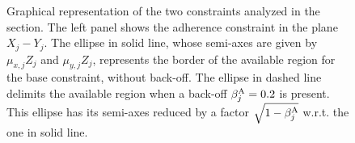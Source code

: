 \begin{figure}
	\caption{Graphical representation of the two constraints analyzed in the section. The left panel shows the adherence constraint in the plane $X_j-Y_j$. The ellipse in solid line, whose semi-axes are given by $\mu_{x,j}Z_j$ and $\mu_{y,j}Z_j$, represents the border of the available region for the base constraint, without back-off. The ellipse in dashed line delimits the available region when a back-off $\beta^\textrm{A}_j=0.2$ is present. This ellipse has its semi-axes reduced by a factor $\sqrt{1-\beta^\textrm{A}_j}$ w.r.t. the one in solid line. 
	}
	\label{fig:robust_constraints}
\end{figure}
